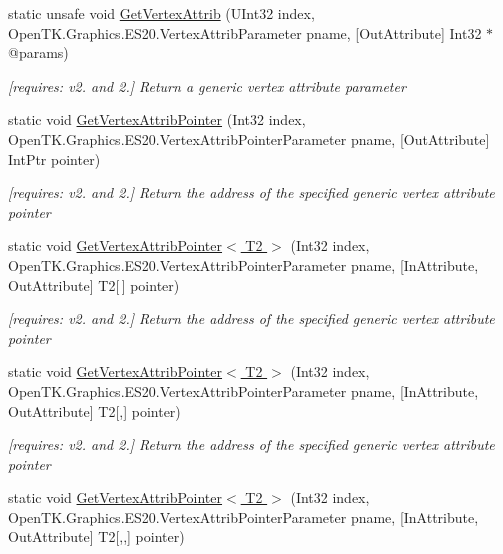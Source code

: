 \begin{DoxyCompactItemize}
static unsafe void \hyperlink{class_open_t_k_1_1_graphics_1_1_e_s20_1_1_g_l_a34a03f029db020871ac2691f53d7335b}{Get\-Vertex\-Attrib} (U\-Int32 index, Open\-T\-K.\-Graphics.\-E\-S20.\-Vertex\-Attrib\-Parameter pname, \mbox{[}Out\-Attribute\mbox{]} Int32 $\ast$@params)
\begin{DoxyCompactList}\small\item\em \mbox{[}requires\-: v2. and 2.\mbox{]} Return a generic vertex attribute parameter \end{DoxyCompactList}\item 
static void \hyperlink{class_open_t_k_1_1_graphics_1_1_e_s20_1_1_g_l_a5ad5a9935e3d5c3164a966ea77414cea}{Get\-Vertex\-Attrib\-Pointer} (Int32 index, Open\-T\-K.\-Graphics.\-E\-S20.\-Vertex\-Attrib\-Pointer\-Parameter pname, \mbox{[}Out\-Attribute\mbox{]} Int\-Ptr pointer)
\begin{DoxyCompactList}\small\item\em \mbox{[}requires\-: v2. and 2.\mbox{]} Return the address of the specified generic vertex attribute pointer \end{DoxyCompactList}\item 
static void \hyperlink{class_open_t_k_1_1_graphics_1_1_e_s20_1_1_g_l_ae7cab124281986f1a04512fcb040da68}{Get\-Vertex\-Attrib\-Pointer$<$ T2 $>$} (Int32 index, Open\-T\-K.\-Graphics.\-E\-S20.\-Vertex\-Attrib\-Pointer\-Parameter pname, \mbox{[}In\-Attribute, Out\-Attribute\mbox{]} T2\mbox{[}$\,$\mbox{]} pointer)
\begin{DoxyCompactList}\small\item\em \mbox{[}requires\-: v2. and 2.\mbox{]} Return the address of the specified generic vertex attribute pointer \end{DoxyCompactList}\item 
static void \hyperlink{class_open_t_k_1_1_graphics_1_1_e_s20_1_1_g_l_ade1688787fb43d26977e7c5becceed10}{Get\-Vertex\-Attrib\-Pointer$<$ T2 $>$} (Int32 index, Open\-T\-K.\-Graphics.\-E\-S20.\-Vertex\-Attrib\-Pointer\-Parameter pname, \mbox{[}In\-Attribute, Out\-Attribute\mbox{]} T2\mbox{[},\mbox{]} pointer)
\begin{DoxyCompactList}\small\item\em \mbox{[}requires\-: v2. and 2.\mbox{]} Return the address of the specified generic vertex attribute pointer \end{DoxyCompactList}\item 
static void \hyperlink{class_open_t_k_1_1_graphics_1_1_e_s20_1_1_g_l_a81b5ef694b35f35273350076f0bc165c}{Get\-Vertex\-Attrib\-Pointer$<$ T2 $>$} (Int32 index, Open\-T\-K.\-Graphics.\-E\-S20.\-Vertex\-Attrib\-Pointer\-Parameter pname, \mbox{[}In\-Attribute, Out\-Attribute\mbox{]} T2\mbox{[},,\mbox{]} pointer)

\end{DoxyCompactItemize}
